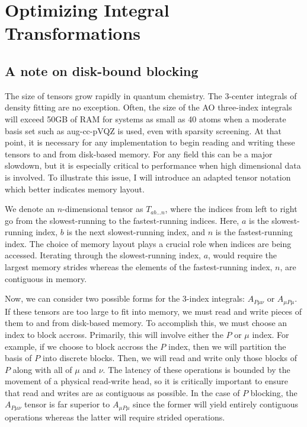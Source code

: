 \chapter{Optimizing Integral Transformations}

\section{A note on disk-bound blocking}

The size of tensors grow rapidly in quantum chemistry.  The 3-center integrals of density fitting are no exception.
Often, the size of the AO three-index integrals will exceed 50GB of RAM for systems as small as 40 atoms when
a moderate basis set such as aug-cc-pVQZ is used, even with sparsity screening.  At that point, it is necessary for
any implementation to begin reading and writing these tensors to and from disk-based memory. For any field this can
be a major slowdown, but it is especially critical to performance when high dimensional data is involved. To illustrate
this issue, I will introduce an adapted tensor notation which better indicates memory layout.

We denote an $n$-dimensional tensor as $T_{ab\hdots n}$, where the indices from left to right go from the slowest-running
to the fastest-running indices. Here, $a$ is the slowest-running index, $b$ is the next slowest-running
index, and $n$ is the fastest-running index. The choice of memory layout plays a crucial role when indices are being accessed.
Iterating through the slowest-running index, $a$, would require the largest memory strides whereas the elements 
of the fastest-running index, $n$, are contiguous in memory. 

Now, we can consider two possible forms for the 3-index integrals: $A_{P\mu\nu}$ or $A_{\mu P\mu}$.
If these tensors are too large to fit into memory, we must read and write pieces of them to and from disk-based memory.
To accomplish this, we must choose an index to block accross. Primarily, this will involve either the $P$ or $\mu$ index.
For example, if we choose to block accross the $P$ index, then we will partition the basis of $P$ into discrete blocks.
Then, we will read and write only those blocks of $P$ along with all of $\mu$ and $\nu$. The latency of these operations is
bounded by the movement of a physical read-write head, so it is critically important to ensure that read and writes are as
contiguous as possible. In the case of $P$ blocking, the $A_{P\mu\nu}$ tensor is far superior to $A_{\mu P\mu}$ since the 
former will yield entirely contiguous operations whereas the latter will require strided operations.  

